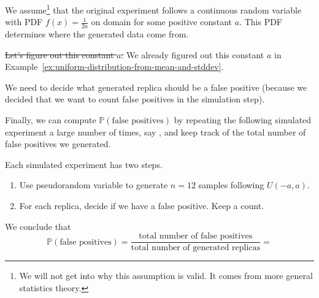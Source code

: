\documentclass[../main.tex]{subfiles}
\begin{document}
\begin{example}
  We assume\footnote{We will not get into why this assumption is valid. It comes from more general statistics theory.}  that the original experiment follows a continuous random variable with PDF \(f(x) = \frac{1}{2a}\) on domain \underline{\hspace{1in}} for some positive constant \(a\).  This PDF determines where the generated data come from.

  \sout{Let's figure out this constant \(a\).} We already figured out this constant \(a\) in Example~\ref{ex:uniform-distribution-from-mean-and-stddev}.

  We need to decide what generated replica should be a false positive (because we decided that we want to count false positives in the simulation step).

  Finally, we can compute \(\mathbb{P}(\text{false positives})\) by repeating the following simulated experiment a large number of times, say \underline{\hspace{2cm}}, and keep track of the total number of false positives we generated.

  Each simulated experiment has two steps.
  \begin{enumerate}
    \item Use pseudorandom variable to generate \(n = 12\) samples following \(U(-a,a)\).
    \item For each replica, decide if we have a false positive.  Keep a count.
  \end{enumerate}

  We conclude that 
  \[
    \mathbb{P}(\text{false positives}) = \frac{\text{total number of false positives}}{\text{total number of generated replicas}} = 
  \]
\end{example}
\end{document}
